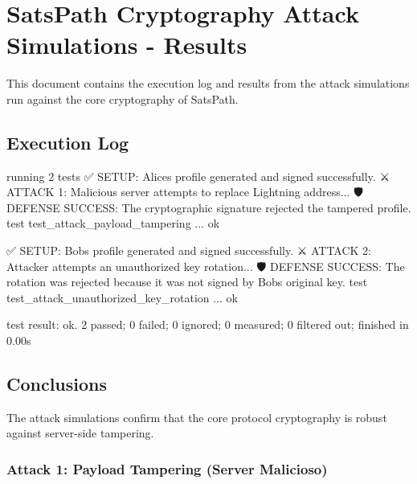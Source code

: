 \documentclass[
]{article}
\author{}
\date{}
\newenvironment{Shaded}{}{}
\newcommand{\NormalTok}[1]{#1}
\begin{document}
\hypertarget{satspath-cryptography-attack-simulations---results}{%
\section{SatsPath Cryptography Attack Simulations -
Results}\label{satspath-cryptography-attack-simulations---results}}

This document contains the execution log and results from the attack
simulations run against the core cryptography of SatsPath.

\hypertarget{execution-log}{%
\subsection{Execution Log}\label{execution-log}}

\begin{Shaded}
\begin{Highlighting}[]
\NormalTok{running 2 tests}
\NormalTok{✅ SETUP: Alice\textquotesingle{}s profile generated and signed successfully.}
\NormalTok{⚔️ ATTACK 1: Malicious server attempts to replace Lightning address...}
\NormalTok{🛡️ DEFENSE SUCCESS: The cryptographic signature rejected the tampered profile.}
\NormalTok{test test\_attack\_payload\_tampering ... ok}

\NormalTok{✅ SETUP: Bob\textquotesingle{}s profile generated and signed successfully.}
\NormalTok{⚔️ ATTACK 2: Attacker attempts an unauthorized key rotation...}
\NormalTok{🛡️ DEFENSE SUCCESS: The rotation was rejected because it was not signed by Bob\textquotesingle{}s original key.}
\NormalTok{test test\_attack\_unauthorized\_key\_rotation ... ok}

\NormalTok{test result: ok. 2 passed; 0 failed; 0 ignored; 0 measured; 0 filtered out; finished in 0.00s}
\end{Highlighting}
\end{Shaded}

\hypertarget{conclusions}{%
\subsection{Conclusions}\label{conclusions}}

The attack simulations confirm that the core protocol cryptography is
robust against server-side tampering.

\hypertarget{attack-1-payload-tampering-server-malicioso}{%
\subsubsection{Attack 1: Payload Tampering (Server
Malicioso)}\label{attack-1-payload-tampering-server-malicioso}}
\end{document}
